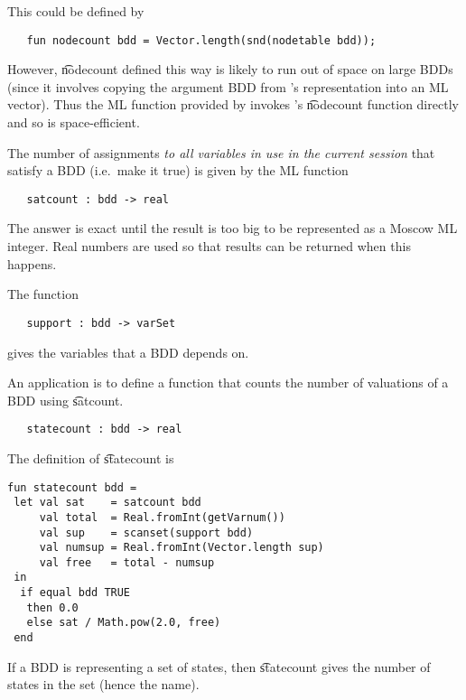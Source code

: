 This could be defined by

\begin{verbatim}
   fun nodecount bdd = Vector.length(snd(nodetable bdd));
\end{verbatim}

However, \t{nodecount} defined this way is likely to run out of space
on large BDDs (since it involves copying the argument BDD from
\Buddy's representation into an ML vector).  Thus the ML function
provided by \Muddy{} invokes \Buddy's \t{nodecount} function directly
and so is space-efficient.

The number of assignments {\it to all variables in use in the current
session\/} that satisfy a BDD (i.e.~make it true) is given by the ML
function

\begin{verbatim}
   satcount : bdd -> real
\end{verbatim}

The answer is exact until the result is too big to be represented as a
Moscow ML integer. Real numbers are used so that results can be
returned when this happens.

The function

\begin{verbatim}
   support : bdd -> varSet
\end{verbatim}

gives the variables that a BDD depends on. 

An application is to define
a function that counts the number of valuations of a BDD using
\t{satcount}.

\begin{verbatim}
   statecount : bdd -> real
\end{verbatim}

The
definition of \t{statecount} is

\begin{verbatim}
fun statecount bdd =
 let val sat    = satcount bdd
     val total  = Real.fromInt(getVarnum())
     val sup    = scanset(support bdd)
     val numsup = Real.fromInt(Vector.length sup)
     val free   = total - numsup
 in 
  if equal bdd TRUE 
   then 0.0
   else sat / Math.pow(2.0, free)
 end
\end{verbatim}
%
If a BDD is representing a set of states, then \t{statecount} gives
the number of states in the set (hence the name).


